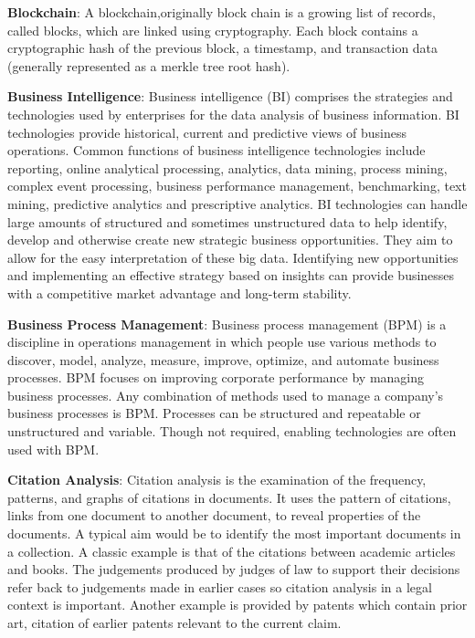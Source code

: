 \documentclass[b5paper,]{book}
\theoremstyle{definition}
\theoremstyle{definition}
\theoremstyle{definition}
\theoremstyle{remark}
\begin{document}
\textbf{Blockchain}: A blockchain,originally block chain is a growing
list of records, called blocks, which are linked using cryptography.
Each block contains a cryptographic hash of the previous block, a
timestamp, and transaction data (generally represented as a merkle tree
root hash).

\textbf{Business Intelligence}: Business intelligence (BI) comprises the
strategies and technologies used by enterprises for the data analysis of
business information. BI technologies provide historical, current and
predictive views of business operations. Common functions of business
intelligence technologies include reporting, online analytical
processing, analytics, data mining, process mining, complex event
processing, business performance management, benchmarking, text mining,
predictive analytics and prescriptive analytics. BI technologies can
handle large amounts of structured and sometimes unstructured data to
help identify, develop and otherwise create new strategic business
opportunities. They aim to allow for the easy interpretation of these
big data. Identifying new opportunities and implementing an effective
strategy based on insights can provide businesses with a competitive
market advantage and long-term stability.

\textbf{Business Process Management}: Business process management (BPM)
is a discipline in operations management in which people use various
methods to discover, model, analyze, measure, improve, optimize, and
automate business processes. BPM focuses on improving corporate
performance by managing business processes. Any combination of methods
used to manage a company's business processes is BPM. Processes can be
structured and repeatable or unstructured and variable. Though not
required, enabling technologies are often used with BPM.

\textbf{Citation Analysis}: Citation analysis is the examination of the
frequency, patterns, and graphs of citations in documents. It uses the
pattern of citations, links from one document to another document, to
reveal properties of the documents. A typical aim would be to identify
the most important documents in a collection. A classic example is that
of the citations between academic articles and books. The judgements
produced by judges of law to support their decisions refer back to
judgements made in earlier cases so citation analysis in a legal context
is important. Another example is provided by patents which contain prior
art, citation of earlier patents relevant to the current claim.
\end{document}
